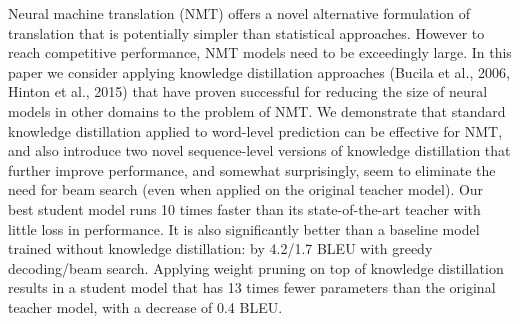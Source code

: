 Neural machine translation (NMT) offers a novel alternative formulation of translation that is potentially simpler than statistical approaches. However to reach competitive performance, NMT models need to be exceedingly large. In this paper we consider applying knowledge distillation approaches (Bucila et al., 2006, Hinton et al., 2015) that have proven successful for reducing the size of neural models in other domains to the problem of NMT. We demonstrate that standard knowledge distillation applied to word-level prediction can be effective for NMT, and also introduce two novel sequence-level versions of knowledge distillation that further improve performance, and somewhat surprisingly, seem to eliminate the need for beam search (even when applied on the original teacher model). Our best student model runs 10 times faster than its state-of-the-art teacher with little loss in performance. It is also significantly better than a baseline model trained without knowledge distillation: by 4.2/1.7 BLEU with greedy decoding/beam search. Applying weight pruning on top of knowledge distillation results in a student model that has 13 times fewer parameters than the original teacher model, with a decrease of 0.4 BLEU.
